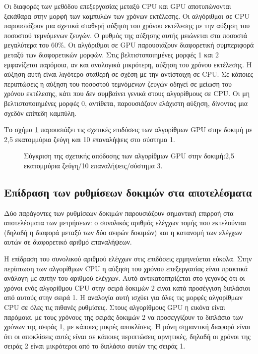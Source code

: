 Οι διαφορές των μεθόδου επεξεργασίας μεταξύ CPU και GPU αποτυπώνονται ξεκάθαρα στην μορφή των καμπυλών των χρόνων εκτέλεσης. Οι αλγόριθμοι σε CPU παρουσιάζουν μια σχετικά σταθερή αύξηση του χρόνου εκτέλεσης με την αύξηση του ποσοστού τεμνόμενων ζευγών. Ο ρυθμός της αύξησης αυτής μειώνεται στα ποσοστά μεγαλύτερα του 60\%. Οι αλγόριθμοι σε GPU παρουσιάζουν διαφορετική συμπεριφορά μεταξύ των διαφορετικών μορφών. Στις βελτιστοποιημένες μορφές 1 και 2 εμφανίζεται παρόμοια, αν και αναλογικά μικρότερη, αύξηση του χρόνου εκτέλεσης. Η αύξηση αυτή είναι λιγότερο σταθερή σε σχέση με την αντίστοιχη σε CPU. Σε κάποιες περιπτώσεις η αύξηση του ποσοστού τεμνόμενων ζευγών οδηγεί σε μείωση του χρόνου εκτέλεσης, κάτι που δεν συμβαίνει γενικά στους αλγορίθμους σε CPU. Οι μη βελτιστοποιημένες μορφές 0, αντίθετα, παρουσιάζουν ελάχιστη αύξηση, δίνοντας μια σχεδόν επίπεδη καμπύλη.  

Το σχήμα \ref{effgpuexample} παρουσιάζει τις σχετικές επιδόσεις των αλγορίθμων GPU στην δοκιμή με 2,5 εκατομμύρια ζεύγη και 10 επαναλήψεις στο σύστημα 1.

\begin{figure}[t]
\begin{center}
\scalebox{0.9}
{

}
\end{center}
\caption{Σύγκριση της σχετικής απόδοσης των αλγορίθμων GPU στην δοκιμή:2,5 εκατομμύρια ζεύγη/10 επαναλήψεις/σύστημα 3.}
\label{effgpuexample}
\end{figure}

\subsection{Επίδραση των ρυθμίσεων δοκιμών στα αποτελέσματα}
\noindent Δύο παράγοντες των ρυθμίσεων δοκιμών παρουσιάζουν σημαντική επιρροή στα αποτελέσματα των μετρήσεων: ο συνολικός αριθμός ελέγχων τομής που εκτελούνται (δηλαδή η διαφορά μεταξύ των δύο σειρών δοκιμών) και η κατανομή των ελέγχων αυτών σε διαφορετικό αριθμό επαναλήψεων.

Η επίδραση του συνολικού αριθμού ελέγχων στις επιδόσεις ερμηνεύεται εύκολα. Στην περίπτωση των αλγορίθμων CPU η αύξηση του χρόνου επεξεργασίας είναι πρακτικά ανάλογη με αυτήν του αριθμού ελέγχων. Αυτό αντικατοπτρίζεται στο γεγονός ότι οι χρόνοι ενός αλγορίθμου CPU στην σειρά δοκιμών 2 είναι κατά προσέγγιση διπλάσιοι από αυτούς στην σειρά 1. Η αναλογία αυτή ισχύει για όλες τις μορφές αλγορίθμων CPU σε όλες τις πιθανές ρυθμίσεις. Στους αλγορίθμους GPU η εικόνα είναι παρόμοια, με τους χρόνους της σειράς δοκιμών 2 να προσεγγίζουν το διπλάσιο των χρόνων της σειράς 1, με κάποιες μικρές αποκλίσεις. Η μόνη σημαντική διαφορά είναι ότι οι αποκλίσεις  αυτές είναι σε κάποιες περιπτώσεις αρνητικές, δηλαδή οι χρόνοι της σειράς 2 είναι μικρότεροι από το διπλάσιο αυτών της σειράς 1.

